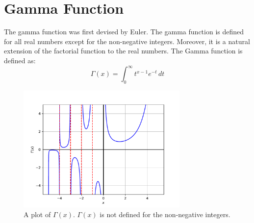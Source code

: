 \documentclass{article}
\theoremstyle{theorem}
\theoremstyle{definition}
\begin{document}
\section{Gamma Function}
The gamma function was first devised by Euler. The gamma function is defined for all real numbers except for the non-negative integers. Moreover, it is a natural extension of the factorial function to the real numbers. The Gamma function is defined as:
\begin{equation}
\Gamma(x) = \int_0^{\infty} t^{x-1} e^{-t}\,dt
\end{equation}
\begin{figure}[htb]
\centering
\includegraphics[width=0.75\textwidth]{gamma.pdf}
\caption{A plot of $\Gamma(x)$. $\Gamma(x)$ is not defined for the non-negative integers.}
\label{fig:gamma}
\end{figure}
\end{document}
